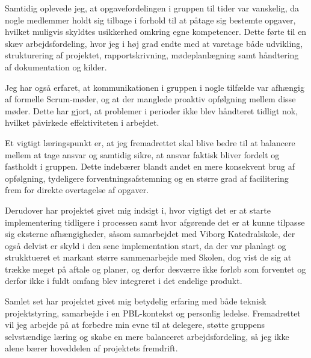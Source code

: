 Samtidig oplevede jeg, at opgavefordelingen i gruppen til tider var vanskelig, da nogle medlemmer holdt sig tilbage i forhold til at påtage sig bestemte opgaver, hvilket muligvis skyldtes usikkerhed omkring egne kompetencer. Dette førte til en skæv arbejdsfordeling, hvor jeg i høj grad endte med at varetage både udvikling, strukturering af projektet, rapportskrivning, mødeplanlægning samt håndtering af dokumentation og kilder.

Jeg har også erfaret, at kommunikationen i gruppen i nogle tilfælde var afhængig af formelle Scrum-møder, og at der manglede proaktiv opfølgning mellem disse møder. Dette har gjort, at problemer i perioder ikke blev håndteret tidligt nok, hvilket påvirkede effektiviteten i arbejdet.

Et vigtigt læringspunkt er, at jeg fremadrettet skal blive bedre til at balancere mellem at tage ansvar og samtidig sikre, at ansvar faktisk bliver fordelt og fastholdt i gruppen. Dette indebærer blandt andet en mere konsekvent brug af opfølgning, tydeligere forventningsafstemning og en større grad af facilitering frem for direkte overtagelse af opgaver.

Derudover har projektet givet mig indsigt i, hvor vigtigt det er at starte implementering tidligere i processen samt hvor afgørende det er at kunne tilpasse sig eksterne afhængigheder, såsom samarbejdet med Viborg Katedralskole, der også delvist er skyld i den sene implementation start, da der var planlagt og strukktueret et markant større sammenarbejde med Skolen, dog vist de sig at trække meget på aftale og planer, og derfor desværre ikke forløb som forventet og derfor ikke i fuldt omfang blev integreret i det endelige produkt.

Samlet set har projektet givet mig betydelig erfaring med både teknisk projektstyring, samarbejde i en PBL-kontekst og personlig ledelse. Fremadrettet vil jeg arbejde på at forbedre min evne til at delegere, støtte gruppens selvstændige læring og skabe en mere balanceret arbejdsfordeling, så jeg ikke alene bærer hoveddelen af projektets fremdrift.